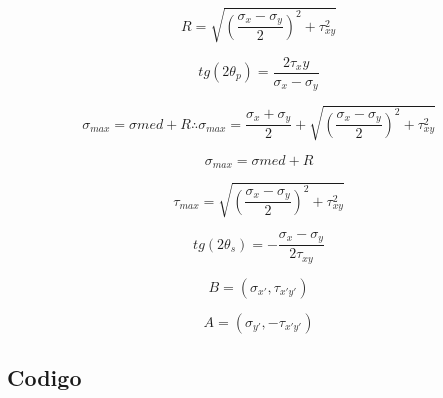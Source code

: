 \documentclass[a4paper]{article}
\begin{document}
		\begin{equation}
			R =  \sqrt{(\frac{\sigma_x - \sigma_y}{2})^2 + \tau_{xy}^2}  
		\end{equation}

		\begin{equation}
			tg(2\theta_p) = \frac{2\tau_xy}{\sigma_x - \sigma_y}
		\end{equation}

		\begin{equation}
			\sigma_{max} = \sigma{med} + R \therefore \sigma_{max} = \frac{\sigma_x + \sigma_y}{2} + \sqrt{(\frac{\sigma_x - \sigma_y}{2})^2 + \tau_{xy}^2}
		\end{equation}

		\begin{equation}
			\sigma_{max} = \sigma{med} + R
		\end{equation}

		\begin{equation}
			\tau_{max} = \sqrt{(\frac{\sigma_x - \sigma_y}{2})^2 + \tau_{xy}^2}
		\end{equation}

		\begin{equation}
			tg(2\theta_s) = - \frac{\sigma_x - \sigma_y}{2\tau_{xy}}
		\end{equation}

		\begin{equation}
			B = (\sigma_{x'}, \tau_{x'y'})
		\end{equation}

		\begin{equation}
			A = (\sigma_{y'}, -\tau_{x'y'})
		\end{equation} 


\label{subsec: Codigo}

\subsection{Codigo}
\end{document}
